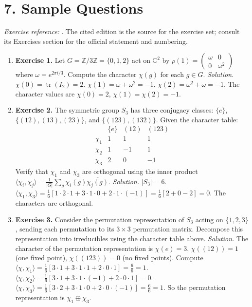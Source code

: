 \section*{7. Sample Questions}
\emph{Exercise reference:} \cite{representation_ref1}. The cited edition is the source for the exercise set; consult its Exercises section for the official statement and numbering.
\begin{enumerate}[leftmargin=*,itemsep=0.9em]
\item \textbf{Exercise 1.} Let $G=\mathbb{Z}/3\mathbb{Z}=\{0,1,2\}$ act on $\mathbb{C}^2$ by $\rho(1)=\begin{pmatrix}\omega&0\\0&\omega^2\end{pmatrix}$ where $\omega=e^{2\pi i/3}$. Compute the character $\chi(g)$ for each $g\in G$. \emph{Solution.} $\chi(0)=\operatorname{tr}(I_2)=2$. $\chi(1)=\omega+\omega^2=-1$. $\chi(2)=\omega^2+\omega=-1$. The character values are $\chi(0)=2$, $\chi(1)=\chi(2)=-1$.

\item \textbf{Exercise 2.} The symmetric group $S_3$ has three conjugacy classes: $\{e\}$, $\{(12),(13),(23)\}$, and $\{(123),(132)\}$. Given the character table:
\[
\begin{array}{c|ccc}
& \{e\} & (12) & (123)\\
\hline
\chi_1 & 1 & 1 & 1\\
\chi_2 & 1 & -1 & 1\\
\chi_3 & 2 & 0 & -1
\end{array}
\]
Verify that $\chi_1$ and $\chi_3$ are orthogonal using the inner product $\langle\chi_i,\chi_j\rangle=\frac{1}{|G|}\sum_{g}\chi_i(g)\overline{\chi_j(g)}$. \emph{Solution.} $|S_3|=6$. $\langle\chi_1,\chi_3\rangle=\frac{1}{6}[1\cdot 2\cdot 1+3\cdot 1\cdot 0+2\cdot 1\cdot(-1)]=\frac{1}{6}[2+0-2]=0$. The characters are orthogonal.

\item \textbf{Exercise 3.} Consider the permutation representation of $S_3$ acting on $\{1,2,3\}$, sending each permutation to its $3\times 3$ permutation matrix. Decompose this representation into irreducibles using the character table above. \emph{Solution.} The character of the permutation representation is $\chi(e)=3$, $\chi((12))=1$ (one fixed point), $\chi((123))=0$ (no fixed points). Compute $\langle\chi,\chi_1\rangle=\frac{1}{6}[3\cdot 1+3\cdot 1\cdot 1+2\cdot 0\cdot 1]=\frac{6}{6}=1$. $\langle\chi,\chi_2\rangle=\frac{1}{6}[3\cdot 1+3\cdot 1\cdot(-1)+2\cdot 0\cdot 1]=0$. $\langle\chi,\chi_3\rangle=\frac{1}{6}[3\cdot 2+3\cdot 1\cdot 0+2\cdot 0\cdot(-1)]=\frac{6}{6}=1$. So the permutation representation is $\chi_1\oplus\chi_3$.


\end{enumerate}
